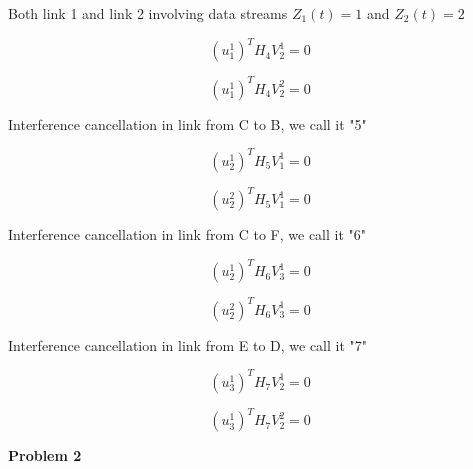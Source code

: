 \documentclass[a4paper,oneside,10pt]{report}
\begin{document}
\begin{enumerate}
Both link 1 and link 2 involving data streams $Z_1(t) = 1$ and $Z_2(t) = 2$

$$(u^1_1)^T H_4 V^1_2 = 0$$

$$(u^1_1)^T H_4 V^2_2 = 0$$

Interference cancellation in link from C to B, we call it "5"

$$(u^1_2)^T H_5 V^1_1 = 0$$

$$(u^2_2)^T H_5 V^1_1 = 0$$

Interference cancellation in link from C to F, we call it "6"

$$(u^1_2)^T H_6 V^1_3 = 0$$

$$(u^2_2)^T H_6 V^1_3 = 0$$

Interference cancellation in link from E to D, we call it "7"

$$(u^1_3)^T H_7 V^1_2 = 0$$

$$(u^1_3)^T H_7 V^2_2 = 0$$

\end{enumerate}

\textbf{Problem 2}
\end{document}
